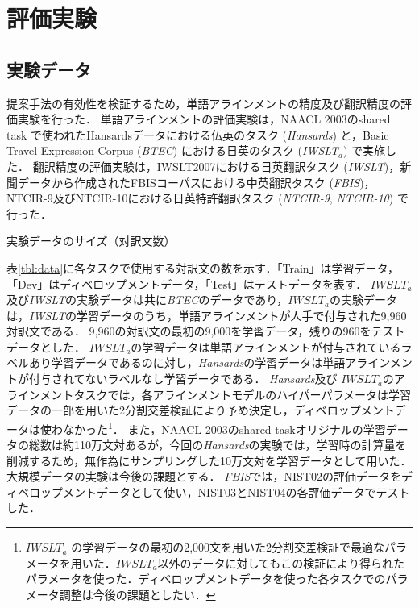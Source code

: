 \documentclass[japanese]{jnlp_1.4}
\begin{document}
\begin{table}[t]

\end{table}


\section{評価実験}
\label{sect:experiment}

\subsection{実験データ}
\label{sect:data}

提案手法の有効性を検証するため，単語アラインメントの精度及び翻訳精度の評価実験を行った．
単語アラインメントの評価実験は，NAACL 2003のshared task \cite{mihalcea03}で使われたHansardsデータにおける仏英のタスク ({\it Hansards}) と，Basic Travel Expression Corpus ({\it BTEC}) \cite{takezawa02}における日英のタスク ({\it IWSLT$_{a}$}) で実施した．
翻訳精度の評価実験は，IWSLT2007における日英翻訳タスク\cite{fordyce07} ({\it IWSLT})，新聞データから作成されたFBISコーパスにおける中英翻訳タスク ({\it FBIS})，NTCIR-9及びNTCIR-10における日英特許翻訳タスク\cite{goto10,goto13} ({\it NTCIR-9}, {\it NTCIR-10}) で行った．

\begin{table}[t]
\caption{実験データのサイズ（対訳文数）}
\label{tbl:data}

\end{table}

表\ref{tbl:data}に各タスクで使用する対訳文の数を示す．「Train」は学習データ，「Dev」はディベロップメントデータ，「Test」はテストデータを表す．
$\mathit{IWSLT}_{a}$及び{\it IWSLT}の実験データは共に{\it BTEC}のデータであり，$\mathit{IWSLT}_{a}$の実験データは，{\it IWSLT}の学習データのうち，単語アラインメントが人手で付与された9,960対訳文である\cite{goh10}．
9,960の対訳文の最初の9,000を学習データ，残りの960をテストデータとした．
$\mathit{IWSLT}_{a}$の学習データは単語アラインメントが付与されているラベルあり学習データであるのに対し，{\it Hansards}の学習データは単語アラインメントが付与されてないラベルなし学習データである．
{\it Hansards}及び $\mathit{IWSLT}_{a}$のアラインメントタスクでは，各アラインメントモデルのハイパーパラメータは学習データの一部を用いた2分割交差検証により予め決定し，ディベロップメントデータは使わなかった\footnote{$\mathit{IWSLT}_{a}$ の学習データの最初の2,000文を用いた2分割交差検証で最適なパラメータを用いた．$\mathit{IWSLT}_{a}$以外のデータに対してもこの検証により得られたパラメータを使った．ディベロップメントデータを使った各タスクでのパラメータ調整は今後の課題としたい．}．
また，NAACL 2003のshared taskオリジナルの学習データの総数は約110万文対あるが，今回の{\it Hansards}の実験では，学習時の計算量を削減するため，無作為にサンプリングした10万文対を学習データとして用いた．大規模データの実験は今後の課題とする．
{\it FBIS}では，NIST02の評価データをディベロップメントデータとして使い，NIST03とNIST04の各評価データでテストした．
\end{document}

